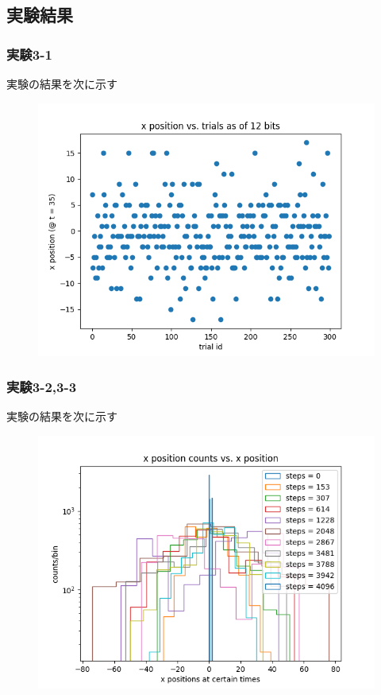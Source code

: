 \documentclass[xelatex,ja=standard]{bxjsarticle}
\begin{document}
\subsection{実験結果}

\subsubsection{実験3-1}
実験の結果を次に示す
\begin{figure}[htbp]
    \centering
    \includegraphics[scale=0.7]
{6.png}
    \label{fig:1}
\end{figure}

\subsubsection{実験3-2,3-3}
実験の結果を次に示す
\begin{figure}[htbp]
    \centering
    \includegraphics[scale=0.7]
{7.png}
    \label{fig:1}
\end{figure}
\end{document}
